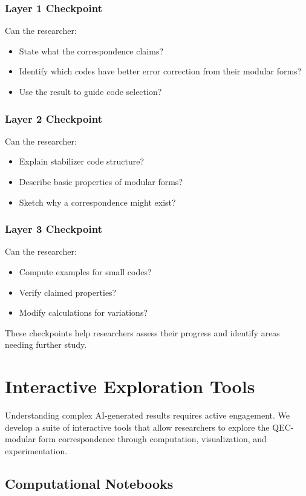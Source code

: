 \documentclass[11pt,a4paper]{article}
\begin{document}
\subsubsection{Layer 1 Checkpoint}
Can the researcher:
\begin{itemize}
\item State what the correspondence claims?
\item Identify which codes have better error correction from their modular forms?
\item Use the result to guide code selection?
\end{itemize}

\subsubsection{Layer 2 Checkpoint}
Can the researcher:
\begin{itemize}
\item Explain stabilizer code structure?
\item Describe basic properties of modular forms?
\item Sketch why a correspondence might exist?
\end{itemize}

\subsubsection{Layer 3 Checkpoint}
Can the researcher:
\begin{itemize}
\item Compute examples for small codes?
\item Verify claimed properties?
\item Modify calculations for variations?
\end{itemize}

These checkpoints help researchers assess their progress and identify areas needing further study.

\section{Interactive Exploration Tools}

Understanding complex AI-generated results requires active engagement. We develop a suite of interactive tools that allow researchers to explore the QEC-modular form correspondence through computation, visualization, and experimentation.

\subsection{Computational Notebooks}
\end{document}
